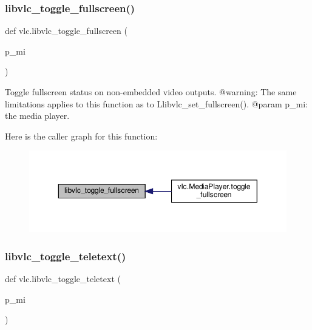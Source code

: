 \subsubsection{\texorpdfstring{libvlc\+\_\+toggle\+\_\+fullscreen()}{libvlc\_toggle\_fullscreen()}}
{\footnotesize\ttfamily def vlc.\+libvlc\+\_\+toggle\+\_\+fullscreen (\begin{DoxyParamCaption}\item[{}]{p\+\_\+mi }\end{DoxyParamCaption})}

\begin{DoxyVerb}Toggle fullscreen status on non-embedded video outputs.
@warning: The same limitations applies to this function
as to L{libvlc_set_fullscreen}().
@param p_mi: the media player.
\end{DoxyVerb}
 Here is the caller graph for this function\+:
\nopagebreak
\begin{figure}[H]
\begin{center}
\leavevmode
\includegraphics[width=350pt]{namespacevlc_a370780527977cf3a710b9c542f88b0aa_icgraph}
\end{center}
\end{figure}
\mbox{\label{namespacevlc_a02d8dbdfe4e01b1399fb964450fa557e}} 
\subsubsection{\texorpdfstring{libvlc\+\_\+toggle\+\_\+teletext()}{libvlc\_toggle\_teletext()}}
{\footnotesize\ttfamily def vlc.\+libvlc\+\_\+toggle\+\_\+teletext (\begin{DoxyParamCaption}\item[{}]{p\+\_\+mi }\end{DoxyParamCaption})}

